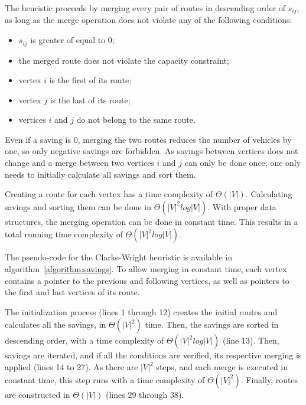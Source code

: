 The heuristic proceeds by merging every pair of routes in descending order of
$s_{ij}$, as long as the merge operation does not violate any of the following
conditions:

\begin{itemize}
  \item $s_{ij}$ is greater of equal to $0$;
  \item the merged route does not violate the capacity constraint;
  \item vertex $i$ is the first of its route;
  \item vertex $j$ is the last of its route;
  \item vertices $i$ and $j$ do not belong to the same route.
\end{itemize}

Even if a saving is $0$, merging the two routes reduces the number of vehicles
by one, so only negative savings are forbidden. As savings between vertices
does not change and a merge between two vertices $i$ and $j$ can only be done
once, one only needs to initially calculate all savings and sort them.

Creating a route for each vertex has a time complexity of $\Theta(|V|)$.
Calculating savings and sorting them can be done in $\Theta(|V|^2 log |V|)$.
With proper data structures, the merging operation can be done in constant time.
This results in a total running time complexity of $\Theta(|V|^2 log |V|)$.

The pseudo-code for the Clarke-Wright heuristic is available in
algorithm~\ref{algorithm:savings}. To allow merging in constant time, each
vertex contains a pointer to the previous and following vertices, as well as
pointers to the first and last vertices of its route.

The initialization process (lines 1 through 12) creates the initial routes and
calculates all the savings, in $\Theta(|V|^2)$ time. Then, the savings are
sorted in descending order, with a time complexity of $\Theta(|V|^2 log |V|)$
(line 13). Then, savings are iterated, and if all the conditions are verified,
its respective merging is applied (lines 14 to 27). As there are $|V|^2$ steps,
and each merge is executed in constant time, this step runs with a time
complexity of $\Theta(|V|^2)$. Finally, routes are constructed in $\Theta(|V|)$
(lines 29 through 38).

